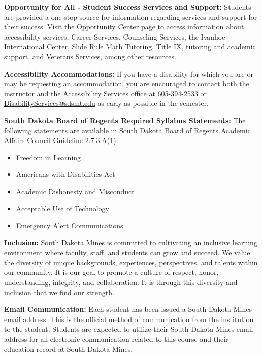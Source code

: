 \documentclass[12pt]{article}
\newcommand{\coursefield}[2]{%
  \vspace{0.2em}\noindent\textbf{#1} #2\par
}
\begin{document}
\coursefield{Opportunity for All - Student Success Services and Support:}{Students are provided a one-stop source for information regarding services and support for their success. Visit the \href{https://www.sdsmt.edu/student-life/opportunity-center/index.html}{Opportunity Center} page to access information about accessibility services, Career Services, Counseling Services, the Ivanhoe International Center, Slide Rule Math Tutoring, Title IX, tutoring and academic support, and Veterans Services, among other resources.
}

\coursefield{Accessibility Accommodations:}{If you have a disability for which you are or may be requesting an accommodation, you are encouraged to contact both the instructor and the Accessibility Services office at 605-394-2533 or \href{mailto:DisabilityServices@sdsmt.edu}{DisabilityServices@sdsmt.edu} as early as possible in the semester.
}

\coursefield{South Dakota Board of Regents Required Syllabus Statements:}{The following statements are available in South Dakota Board of Regents \href{https://public.powerdms.com/SDRegents/tree/documents/1677929}{Academic Affairs Council Guideline 2.7.3.A(1)}:
\begin{itemize}
  \item Freedom in Learning
  \item Americans with Disabilities Act
  \item Academic Dishonesty and Misconduct
  \item Acceptable Use of Technology
  \item Emergency Alert Communications
\end{itemize}
}

\coursefield{Inclusion:}{South Dakota Mines is committed to cultivating an inclusive learning environment where faculty, staff, and students can grow and succeed. We value the diversity of unique backgrounds, experiences, perspectives, and talents within our community. It is our goal to promote a culture of respect, honor, understanding, integrity, and collaboration. It is through this diversity and inclusion that we find our strength.
}

\coursefield{Email Communication:}{Each student has been issued a South Dakota Mines email address. This is the official method of communication from the institution to the student. Students are expected to utilize their South Dakota Mines email address for all electronic communication related to this course and their education record at South Dakota Mines.}
\end{document}

